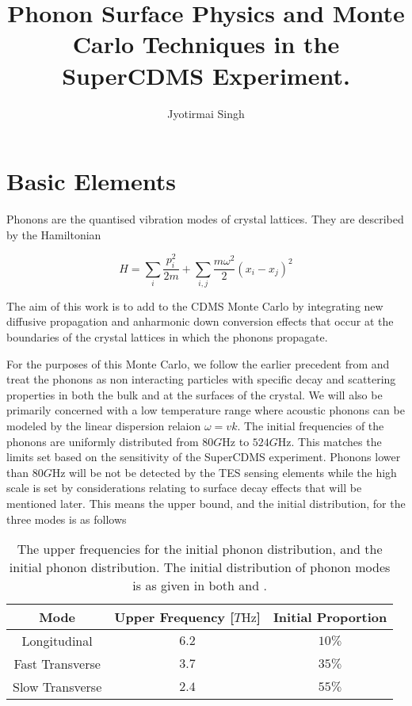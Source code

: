 \documentclass[11pt]{article}
\begin{document}
\title{Phonon Surface Physics and Monte Carlo Techniques in the SuperCDMS Experiment.}
\author{Jyotirmai Singh}
\date{}
\maketitle

\section*{Basic Elements}
Phonons are the quantised vibration modes of crystal lattices. They are described by the Hamiltonian \cite{1}

\begin{equation}
H = \sum_i \frac{p_i^2}{2m} + \sum_{i,j} \frac{m\omega^2}{2}(x_i - x_j)^2
\end{equation}

The aim of this work is to add to the CDMS Monte Carlo by integrating new diffusive propagation and anharmonic
down conversion effects that occur at the boundaries of the crystal lattices in which the phonons propagate. 

For the purposes of this Monte Carlo, we follow the earlier precedent from \cite{1} and treat the phonons as non
interacting particles with specific decay and scattering properties in both the bulk and at the surfaces of the crystal. We
will also be primarily concerned with a low temperature range where acoustic phonons can be modeled by the linear 
dispersion relaion $\omega = vk$. The initial frequencies of the phonons are uniformly distributed from $80 \si{G\hertz}$ to $524 \si{G\hertz}$.
This matches the limits set based on the sensitivity of the SuperCDMS experiment. Phonons lower than $80\si{G\hertz}$ will
be not be detected by the TES sensing elements \cite{2} while the high scale is set by considerations relating to surface decay effects that will be
mentioned later. This means the upper bound, and the initial distribution, for the three modes is as follows
\begin{table}[!h]
\begin{center}
\begin{tabular}{|c|c|c|} \hline
Mode & Upper Frequency [$\si{T\hertz}$] & Initial Proportion \\  \hline
Longitudinal & $6.2$ & $10\%$ \\ \hline
Fast Transverse & $3.7$ & $35\%$ \\ \hline
Slow Transverse & $2.4$ & $55\%$\\ \hline
\end{tabular}
\end{center}
\caption{The upper frequencies for the initial phonon distribution, and the initial phonon distribution. The initial distribution of phonon modes is as given in both \cite{1} and \cite{2}.}
\end{table}
\end{document}
